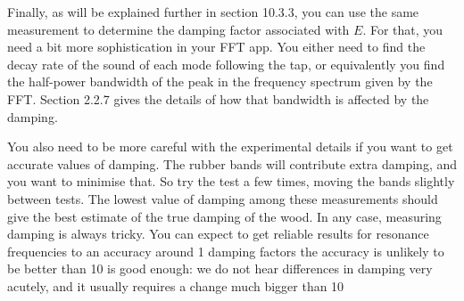   Finally, as will be explained further in section 10.3.3, you can use the same 
  measurement to determine the damping factor associated with $E$. For that, 
  you need a bit more sophistication in your FFT app. You either need to find 
  the decay rate of the sound of each mode following the tap, or equivalently 
  you find the half-power bandwidth of the peak in the frequency spectrum given 
  by the FFT. Section 2.2.7 gives the details of how that bandwidth is affected 
  by the damping. 

  You also need to be more careful with the experimental details if you want to 
  get accurate values of damping. The rubber bands will contribute extra 
  damping, and you want to minimise that. So try the test a few times, moving 
  the bands slightly between tests. The lowest value of damping among these 
  measurements should give the best estimate of the true damping of the wood. 
  In any case, measuring damping is always tricky. You can expect to get 
  reliable results for resonance frequencies to an accuracy around 1%
  damping factors the accuracy is unlikely to be better than 10%
  is good enough: we do not hear differences in damping very acutely, and it 
  usually requires a change much bigger than 10%